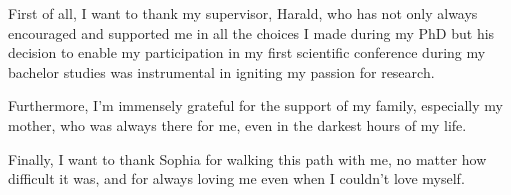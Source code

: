 First of all, I want to thank my supervisor, Harald, who has not only always encouraged and supported me in all the choices I made during my PhD but his decision to enable my participation in my first scientific conference during my bachelor studies was instrumental in igniting my passion for research.


Furthermore, I'm immensely grateful for the support of my family, especially my mother, who was always there for me, even in the darkest hours of my life.

Finally, I want to thank Sophia for walking this path with me, no matter how difficult it was, and for always loving me even when I couldn't love myself.